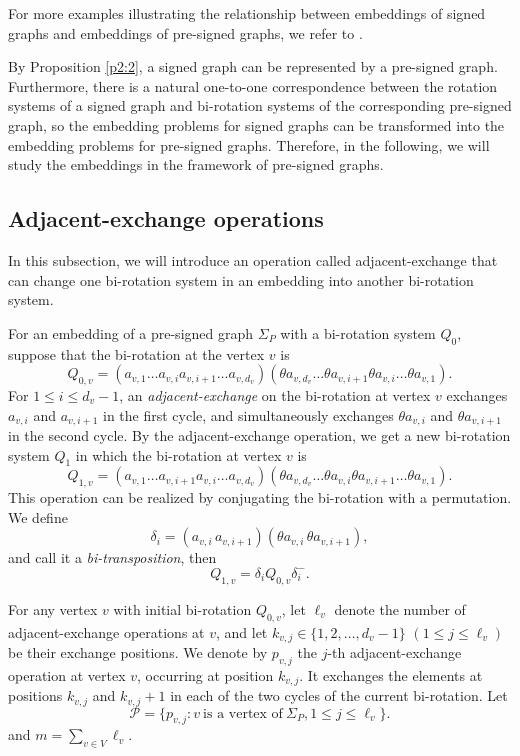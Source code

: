 \documentclass[12pt]{article}
\theoremstyle{definition}
\begin{document}
For more examples illustrating the relationship between embeddings of signed graphs and embeddings of pre-signed graphs, we refer to \cite{Chen2026PreSigned,Chen2026PreSigned01}.

By Proposition \ref{p2:2}, a signed graph can be represented by a pre-signed graph. Furthermore, there is a natural one-to-one correspondence between the rotation systems of a signed graph and bi-rotation systems of the corresponding pre-signed graph, so the embedding problems for signed graphs can be transformed into the embedding problems for pre-signed graphs. Therefore, in the following, we will study the embeddings in the framework of pre-signed graphs.

\subsection{Adjacent-exchange operations}
In this subsection, we will introduce an operation called adjacent-exchange that can change one bi-rotation system in an embedding into another bi-rotation system.

For an embedding of a pre-signed graph $\Sigma_P$ with a bi-rotation system $Q_0$, suppose that the bi-rotation at the vertex $v$ is
$$Q_{0,v}=(a_{v,1}\ldots a_{v,i} a_{v,i+1}\ldots a_{v,d_v}) (\theta a_{v,d_v}\ldots\theta a_{v,i+1}  \theta a_{v,i}\ldots\theta a_{v,1}).$$
For $1\leq i\leq d_{v}-1$, an {\it adjacent-exchange} on the bi-rotation at vertex $v$ exchanges $a_{v,i}$ and $a_{v,i+1}$  in the first cycle, and simultaneously exchanges  $\theta a_{v,i}$ and
$\theta a_{v,i+1}$ in the second cycle.
By the adjacent-exchange operation, we get a new bi-rotation system $Q_1$ in which the  bi-rotation at vertex $v$ is
$$Q_{1,v}=(a_{v,1}\ldots a_{v,i+1} a_{v,i}\ldots a_{v,d_v}) (\theta a_{v,d_v}\ldots\theta a_{v,i}\theta a_{v,i+1}\ldots\theta a_{v,1}).$$
This operation can be realized by conjugating the bi-rotation with a permutation. We define
$$
\delta_i=
(a_{v,i}\,a_{v,i+1})
(\theta a_{v,i}\,\theta a_{v,i+1}),
$$and call it  a {\it bi-transposition}, then
$$Q_{1,v}=\delta_i Q_{0,v} \delta_i^-.$$

For any vertex $v$ with initial bi-rotation $Q_{0,v}$, let $\ell_v$ denote the number of  adjacent-exchange operations at $v$, and let $k_{v,j}\in\{1,2,\ldots,d_v-1\}$ $(1\leq j \leq \ell_v)$ be their exchange positions.
We denote by $p_{v,j}$ the $j$-th adjacent-exchange operation at vertex $v$, occurring at position $k_{v,j}$. It exchanges the elements at positions $k_{v,j}$ and $k_{v,j}+1$ in each of the two cycles of the current bi-rotation. Let
$$\mathcal P=\{p_{v,j}: v ~\mbox{is a vertex of}~ \Sigma_P, 1\leq j\leq \ell_v\}.$$ and $m=\sum_{v\in V}\ell_v$.
\end{document}
